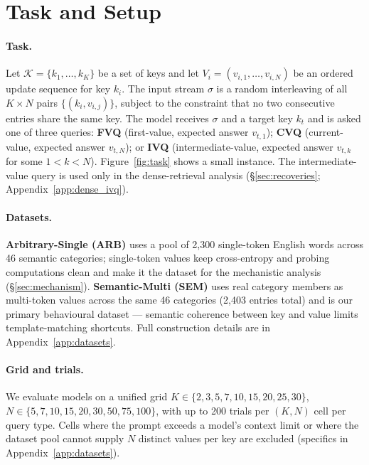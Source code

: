 \documentclass[11pt]{article}
\begin{document}
\section{Task and Setup}
\label{sec:setup}

\paragraph{Task.}
Let $\mathcal{K} = \{k_1, \ldots, k_K\}$ be a set of keys and let
$V_i = (v_{i,1}, \ldots, v_{i,N})$ be an ordered update sequence for
key $k_i$.
The input stream $\sigma$ is a random interleaving of all
$K \times N$ pairs $\{(k_i, v_{i,j})\}$, subject to the constraint
that no two consecutive entries share the same key.
The model receives $\sigma$ and a target key $k_t$ and is asked one
of three queries: \textbf{FVQ} (first-value, expected answer
$v_{t,1}$); \textbf{CVQ} (current-value, expected answer $v_{t,N}$);
or \textbf{IVQ} (intermediate-value, expected answer $v_{t,k}$ for
some $1 < k < N$).
Figure~\ref{fig:task} shows a small instance. The intermediate-value
query is used only in the dense-retrieval analysis
(\S\ref{sec:recoveries}; Appendix~\ref{app:dense_ivq}).

\paragraph{Datasets.}
\textbf{Arbitrary-Single (ARB)} uses a pool of 2{,}300 single-token
English words across 46 semantic categories;
single-token values keep cross-entropy and probing computations
clean and make it the dataset for the mechanistic analysis
(\S\ref{sec:mechanism}).
\textbf{Semantic-Multi (SEM)} uses real category members as
multi-token values across the same 46 categories (2{,}403 entries
total) and is our primary behavioural dataset --- semantic coherence
between key and value limits template-matching shortcuts.
Full construction details are in Appendix~\ref{app:datasets}.

\paragraph{Grid and trials.}
We evaluate models on a unified grid
$K \in \{2, 3, 5, 7, 10, 15, 20, 25, 30\}$,
$N \in \{5, 7, 10, 15, 20, 30, 50, 75, 100\}$, with up to 200 trials
per $(K, N)$ cell per query type.
Cells where the prompt exceeds a model's context limit or where the
dataset pool cannot supply $N$ distinct values per key are excluded
(specifics in Appendix~\ref{app:datasets}).
\end{document}
